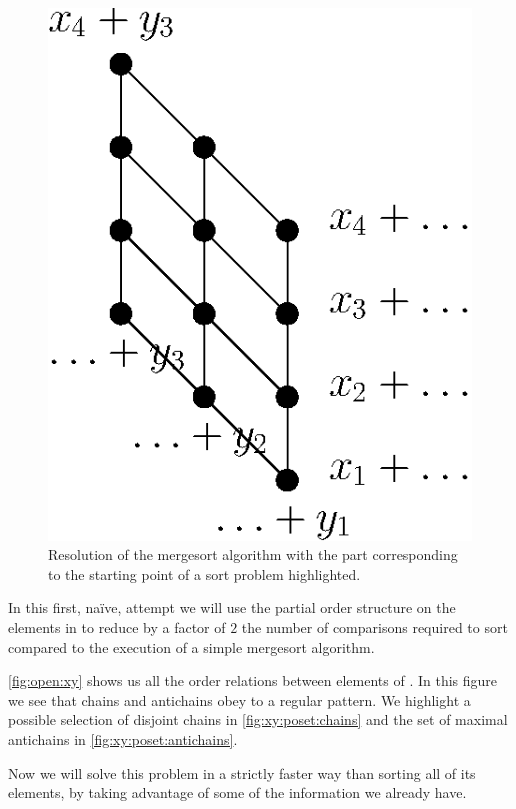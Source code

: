 \begin{figure}
\centering
\includegraphics[width=\textwidth]{fig/open/x+y}
\caption{Resolution of the mergesort algorithm with the part
corresponding to the starting point of a sort \XY problem highlighted.}
\label{fig:xy:poset:mergexy}
\end{figure}

In this first, naïve, attempt we will use the partial order structure on the
elements in \XY to reduce by a factor of $2$ the number of comparisons required
to sort \XY compared to the execution of a simple mergesort algorithm.

\ref{fig:open:xy} shows us all the order relations between elements of \XY. In
this figure we see that chains and antichains obey to a regular pattern. We
highlight a possible selection of disjoint chains in \ref{fig:xy:poset:chains}
and the set of maximal antichains in \ref{fig:xy:poset:antichains}.

Now we will solve this problem in a strictly faster way than sorting all
of its elements, by taking advantage of some of the information we already have.

